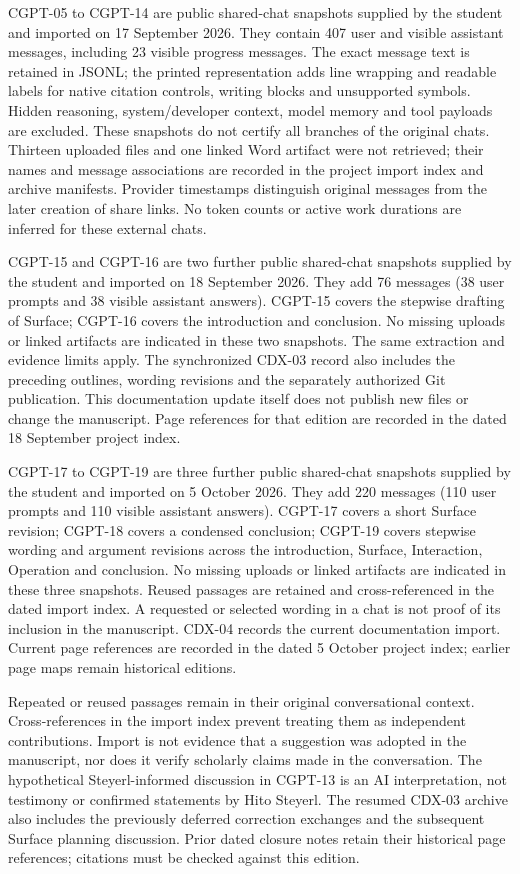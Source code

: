 \documentclass[10pt,a4paper]{article}
\begin{document}
CGPT-05 to CGPT-14 are public shared-chat snapshots supplied by the student
and imported on 17 September 2026. They contain 407 user and visible assistant
messages, including 23 visible progress messages. The exact message text is
retained in JSONL; the printed representation adds line wrapping and readable
labels for native citation controls, writing blocks and unsupported symbols.
Hidden reasoning, system/developer context, model memory and tool payloads are
excluded. These snapshots do not certify all branches of the original chats.
Thirteen uploaded files and one linked Word artifact were not retrieved;
their names and message associations are recorded in the project import index
and archive manifests. Provider timestamps distinguish original messages from
the later creation of share links. No token counts or active work durations
are inferred for these external chats.

CGPT-15 and CGPT-16 are two further public shared-chat snapshots supplied
by the student and imported on 18 September 2026. They add 76 messages
(38 user prompts and 38 visible assistant answers). CGPT-15 covers the
stepwise drafting of Surface; CGPT-16 covers the introduction and conclusion.
No missing uploads or linked artifacts are indicated in these two snapshots.
The same extraction and evidence limits apply. The synchronized CDX-03 record
also includes the preceding outlines, wording revisions and the separately
authorized Git publication. This documentation update itself does not publish
new files or change the manuscript. Page references for that edition are recorded in
the dated 18 September project index.

CGPT-17 to CGPT-19 are three further public shared-chat snapshots supplied
by the student and imported on 5 October 2026. They add 220 messages
(110 user prompts and 110 visible assistant answers). CGPT-17 covers a
short Surface revision; CGPT-18 covers a condensed conclusion; CGPT-19
covers stepwise wording and argument revisions across the introduction,
Surface, Interaction, Operation and conclusion. No missing uploads or linked
artifacts are indicated in these three snapshots. Reused passages are retained
and cross-referenced in the dated import index. A requested or selected wording
in a chat is not proof of its inclusion in the manuscript. CDX-04 records
the current documentation import. Current page references are recorded in
the dated 5 October project index; earlier page maps remain historical editions.

Repeated or reused passages remain in their original conversational context.
Cross-references in the import index prevent treating them as independent
contributions. Import is not evidence that a suggestion was adopted in the
manuscript, nor does it verify scholarly claims made in the conversation.
The hypothetical Steyerl-informed discussion in CGPT-13 is an AI interpretation,
not testimony or confirmed statements by Hito Steyerl. The resumed CDX-03
archive also includes the previously deferred correction exchanges and the
subsequent Surface planning discussion. Prior dated closure notes retain their
historical page references; citations must be checked against this edition.
\end{document}
